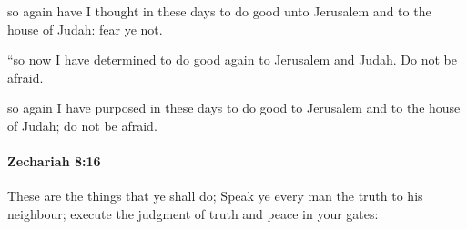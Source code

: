 			\begin{versebox}
					\item[BHS] 
					\item[LXX] 
					\item[ASV] so again have I thought in these days to do good unto Jerusalem and to the house of Judah: fear ye not.
					\item[NIV] “so now I have determined to do good again to Jerusalem and Judah. Do not be afraid.
					\item[NRSV] so again I have purposed in these days to do good to Jerusalem and to the house of Judah; do not be afraid.
			\end{versebox}

		\paragraph{Zechariah 8:16} %
			\label{ZECHARIAH-8-16}

			These are the things that ye shall do; Speak ye every man the truth to his neighbour; execute the judgment of truth and peace in your gates:

